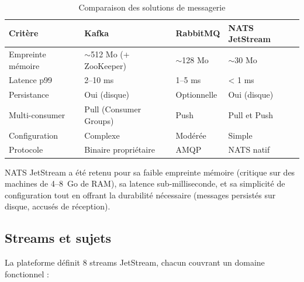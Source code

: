 \begin{table}[H]
\centering
\caption{Comparaison des solutions de messagerie}
\label{tab:messaging}
\small
\begin{tabularx}{\textwidth}{lXXX}
\toprule
\textbf{Critère} & \textbf{Kafka} & \textbf{RabbitMQ} & \textbf{NATS JetStream} \\
\midrule
Empreinte mémoire & $\sim$512 Mo (+ ZooKeeper) & $\sim$128 Mo & $\sim$30 Mo \\
Latence p99       & 2--10 ms  & 1--5 ms   & < 1 ms \\
Persistance       & Oui (disque) & Optionnelle & Oui (disque) \\
Multi-consumer    & Pull (Consumer Groups) & Push & Pull et Push \\
Configuration     & Complexe  & Modérée   & Simple \\
Protocole         & Binaire propriétaire & AMQP & NATS natif \\
\bottomrule
\end{tabularx}
\end{table}

NATS JetStream \cite{nats_docs} a été retenu pour sa faible empreinte mémoire
(critique sur des machines de 4--8~Go de RAM), sa latence sub-milliseconde,
et sa simplicité de configuration tout en offrant la durabilité nécessaire
(messages persistés sur disque, accusés de réception).

\subsection{Streams et sujets}

La plateforme définit 8 streams JetStream, chacun couvrant un domaine fonctionnel :

